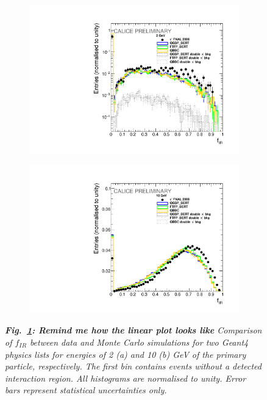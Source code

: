 \begin{figure}[H]
	\centering
	\begin{subfigure}{0.5\textwidth}
		\centering
		\includegraphics[width=.90\linewidth]{ECAL/plots/e-ir-2.pdf}
		\caption{\label{fig:efr2} }
	\end{subfigure}%
	\begin{subfigure}{0.5\textwidth}
		\centering
		\includegraphics[width=.90\linewidth]{ECAL/plots/e-ir-10.pdf}
		\caption{\label{fig:efr10} }
	\end{subfigure}
	\caption{\label{fig:irexample} \sl {\bf Fig.~\ref{fig:efr2}: Remind me how the linear plot looks like} Comparison of $f_{IR}$ between data and Monte Carlo simulations for two {\sc Geant}4 physics lists for energies of 2 (a) and 10 (b) GeV of the primary particle, respectively. The first bin contains events without a detected interaction region. All histograms are normalised to unity. Error bars represent statistical uncertainties only.}
\end{figure}

